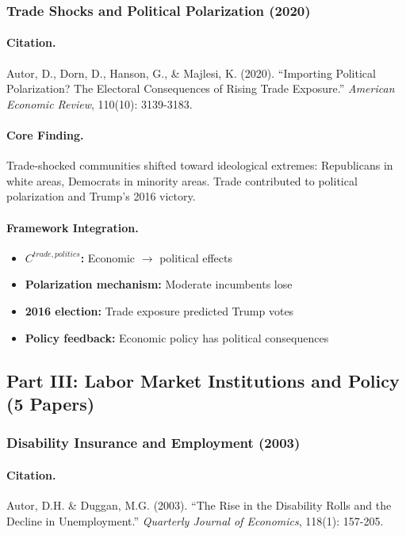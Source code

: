 \documentclass[12pt,a4paper]{article}
\begin{document}
\subsubsection{Trade Shocks and Political Polarization (2020)}

\paragraph{Citation.}
Autor, D., Dorn, D., Hanson, G., \& Majlesi, K. (2020). ``Importing
Political Polarization? The Electoral Consequences of Rising Trade Exposure.''
\emph{American Economic Review}, 110(10): 3139-3183.

\paragraph{Core Finding.}
Trade-shocked communities shifted toward ideological extremes: Republicans
in white areas, Democrats in minority areas. Trade contributed to
political polarization and Trump's 2016 victory.

\paragraph{Framework Integration.}
\begin{itemize}
  \item \textbf{$C^{trade,politics}$:} Economic $\to$ political effects
  \item \textbf{Polarization mechanism:} Moderate incumbents lose
  \item \textbf{2016 election:} Trade exposure predicted Trump votes
  \item \textbf{Policy feedback:} Economic policy has political consequences
\end{itemize}

\subsection{Part III: Labor Market Institutions and Policy (5 Papers)}

\subsubsection{Disability Insurance and Employment (2003)}

\paragraph{Citation.}
Autor, D.H. \& Duggan, M.G. (2003). ``The Rise in the Disability Rolls
and the Decline in Unemployment.''
\emph{Quarterly Journal of Economics}, 118(1): 157-205.
\end{document}

